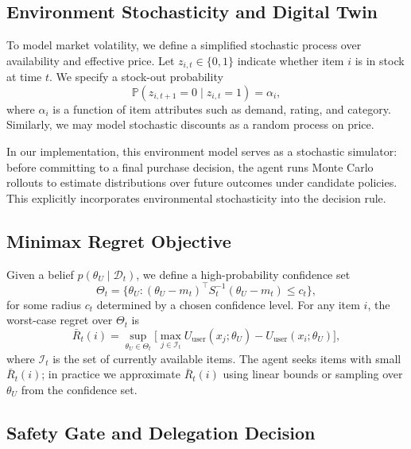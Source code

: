 \documentclass[11pt]{article}
\begin{document}
\subsection{Environment Stochasticity and Digital Twin}

To model market volatility, we define a simplified stochastic process over availability and effective price. Let $z_{i,t} \in \{0,1\}$ indicate whether item $i$ is in stock at time $t$. We specify a stock-out probability
\begin{equation}
\mathbb{P}(z_{i,t+1} = 0 \mid z_{i,t} = 1) = \alpha_i,
\end{equation}
where $\alpha_i$ is a function of item attributes such as demand, rating, and category. Similarly, we may model stochastic discounts as a random process on price.

In our implementation, this environment model serves as a stochastic simulator: before committing to a final purchase decision, the agent runs Monte Carlo rollouts to estimate distributions over future outcomes under candidate policies. This explicitly incorporates environmental stochasticity into the decision rule.

\subsection{Minimax Regret Objective}

Given a belief $p(\theta_U \mid \mathcal{D}_t)$, we define a high-probability confidence set
\begin{equation}
\Theta_t = \{\theta_U : (\theta_U - m_t)^\top S_t^{-1} (\theta_U - m_t) \leq c_t\},
\end{equation}
for some radius $c_t$ determined by a chosen confidence level. For any item $i$, the worst-case regret over $\Theta_t$ is
\begin{equation}
\bar{R}_t(i) = \sup_{\theta_U \in \Theta_t} \Big[ \max_{j \in \mathcal{I}_t} U_{\text{user}}(x_j; \theta_U) - U_{\text{user}}(x_i; \theta_U) \Big],
\end{equation}
where $\mathcal{I}_t$ is the set of currently available items. The agent seeks items with small $\bar{R}_t(i)$; in practice we approximate $\bar{R}_t(i)$ using linear bounds or sampling over $\theta_U$ from the confidence set.\cite{rigter2020minimax}

\subsection{Safety Gate and Delegation Decision}
\end{document}
